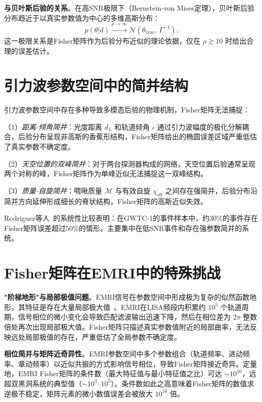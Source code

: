 \textbf{与贝叶斯后验的关系}。在高SNR极限下（Bernstein-von Mises定理），贝叶斯后验分布趋近于以真实参数值为中心的多维高斯分布：
\begin{equation}
  p(\theta | d) \xrightarrow{\rho \to \infty} \mathcal{N}\!\left(\theta_\mathrm{true},\, \Gamma^{-1}\right).
\end{equation}
这一极限关系是Fisher矩阵作为后验分布近似的理论依据，仅在 $\rho \gtrsim 10$ 时给出合理的误差估计。

\section{引力波参数空间中的简并结构}

引力波参数空间中存在多种导致多模态后验的物理机制，Fisher矩阵无法捕捉：

（1）\textit{距离-倾角简并}：光度距离 $d_L$ 和轨道倾角 $\iota$ 通过引力波幅度的极化分解耦合，后验分布呈现非高斯的香蕉形结构，Fisher矩阵给出的椭圆误差区域严重低估了真实参数不确定度。

（2）\textit{天空位置的双峰简并}：对于两台探测器构成的网络，天空位置后验通常呈现两个对称的峰，Fisher矩阵作为单峰近似无法捕捉这一双峰结构。

（3）\textit{质量-自旋简并}：啁啾质量 $\mathcal{M}$ 与有效自旋 $\chi_\mathrm{eff}$ 之间存在强简并，后验分布沿简并方向延伸形成细长的脊状结构，Fisher矩阵的高斯近似失效。

Rodriguez等人~\cite{Rodriguez2013Fisher}的系统性比较表明：在GWTC-1的事件样本中，约30\%的事件存在Fisher矩阵误差超过50\%的情形，主要集中在低SNR事件和存在强参数简并的系统。

\section{Fisher矩阵在EMRI中的特殊挑战}

\textbf{"阶梯地形"与局部极值问题}。EMRI信号在参数空间中形成极为复杂的似然函数地形，其特征是存在大量局部极大值~\cite{Babak2017EMRI}。EMRI在LISA频段内积累约 $10^5$ 个轨道周期，信号相位的微小变化会导致匹配滤波输出迅速下降，然后在相位差为 $2\pi$ 整数倍处再次出现局部极大值。Fisher矩阵只描述真实参数值附近的局部曲率，无法反映远处局部极值的存在，严重低估了全局参数不确定度。

\textbf{相位简并与矩阵近奇异性}。EMRI参数空间中多个参数组合（轨道频率、进动频率、章动频率）以近似共振的方式影响信号相位，导致Fisher矩阵接近奇异。定量地，EMRI Fisher矩阵的条件数（最大特征值与最小特征值之比）可达 $\sim 10^{10}$，远超双黑洞系统的典型值（$\sim 10^3$--$10^5$）。条件数如此之高意味着Fisher矩阵的数值求逆极不稳定，矩阵元素的微小数值误差会被放大 $10^{10}$ 倍。

